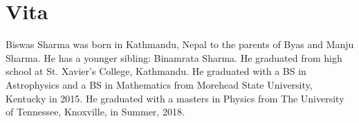 \chapter*{Vita}
Biswas Sharma was born in Kathmandu, Nepal to the parents of Byas and Manju Sharma. He has a younger sibling: Binamrata Sharma. He graduated from high school at St. Xavier's College, Kathmandu. He graduated with a BS in Astrophysics and a BS in Mathematics from Morehead State University, Kentucky in 2015. He graduated with a masters in Physics from The University of Tennessee, Knoxville, in Summer, 2018.
